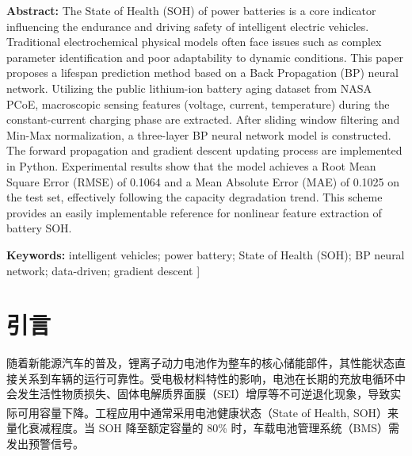 \documentclass[twocolumn,10pt,a4paper,twoside]{ctexart}
\newcommand{\upcite}[1]{\textsuperscript{\cite{#1}}}
\begin{document}
    \vspace{1em}
    \noindent {} \textbf{Abstract:} The State of Health (SOH) of power batteries is a core indicator influencing the endurance and driving safety of intelligent electric vehicles. Traditional electrochemical physical models often face issues such as complex parameter identification and poor adaptability to dynamic conditions. This paper proposes a lifespan prediction method based on a Back Propagation (BP) neural network. Utilizing the public lithium-ion battery aging dataset from NASA PCoE, macroscopic sensing features (voltage, current, temperature) during the constant-current charging phase are extracted. After sliding window filtering and Min-Max normalization, a three-layer BP neural network model is constructed. The forward propagation and gradient descent updating process are implemented in Python. Experimental results show that the model achieves a Root Mean Square Error (RMSE) of 0.1064 and a Mean Absolute Error (MAE) of 0.1025 on the test set, effectively following the capacity degradation trend. This scheme provides an easily implementable reference for nonlinear feature extraction of battery SOH.

    \vspace{0.5em}
    \noindent {} \textbf{Keywords:} intelligent vehicles; power battery; State of Health (SOH); BP neural network; data-driven; gradient descent
    \vspace{1.0em}
]

\thispagestyle{firstpage}

 \songti

\section{引言}
随着新能源汽车的普及，锂离子动力电池作为整车的核心储能部件，其性能状态直接关系到车辆的运行可靠性。受电极材料特性的影响，电池在长期的充放电循环中会发生活性物质损失、固体电解质界面膜（SEI）增厚等不可逆退化现象，导致实际可用容量下降\upcite{ref3}。工程应用中通常采用电池健康状态（State of Health, SOH）来量化衰减程度。当 SOH 降至额定容量的 80\% 时，车载电池管理系统（BMS）需发出预警信号。
\end{document}
